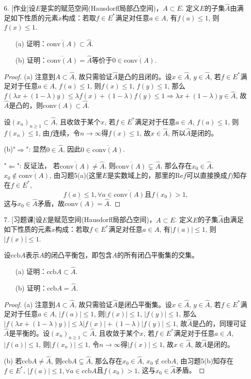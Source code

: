 \documentclass[a4paper,8pt]{ctexart}\textwidth 140mm \textheight 216mm
\newcommand{\8}{\infty}
\renewcommand{\Re}{\mathrm{Re}}
\newcommand{\RA}{\Rightarrow}
\newcommand{\LA}{\Leftarrow}
\begin{document}
6. [作业]设$E$是实的赋范空间(Hausdorff局部凸空间)，$A\subset E$. 定义$E$的子集$\hat{A}$由满足如下性质的元素$x$构成：若取$f\in E^*$满足对任意$a\in A$, 有$f(a)\leq 1$, 则$f(x)\leq 1$. 
\begin{itemize}
	\item[(a)] 证明：$\overline{\mathrm{conv}(A)}\subset \hat{A}$.
	\item[(b)] 证明：$\overline{\mathrm{conv}(A)}=\hat{A}$等价于$0\in\overline{\mathrm{conv}(A)}$.
\end{itemize}
\begin{proof}
	(a) 注意到$A\subset\hat{A}$, 故只需验证$\hat{A}$是凸的且闭的。设$x\in \hat{A}$, $y\in\hat{A}$, 若$f\in E^*$满足对于任意$a\in A$, $f(a)\leq 1$, 则$f(x)\leq 1$, $f(y)\leq 1$, 那么$f(\lambda x+(1-\lambda)y)\leq \lambda f(x)+(1-\lambda)f(y)\leq 1\RA \lambda x+(1-\lambda)y\in\hat{A}$, 故$\hat{A}$是凸的，则$\mathrm{conv}(A)\subset\hat{A}$. 
	
	设$(x_n)_{n\geq 1}\subset \hat{A}$, 且收敛于某个$x$, 若$f\in E^*$满足对于任意$a\in A$, $f(a)\leq 1$, 则$f(x_n)\leq 1$, 由$f$连续，令$n\to\infty$得$f(x)\leq 1$, 故$x\in\hat{A}$, 所以$\hat{A}$是闭的。
	
	(b)"$\RA$": 显然$0\in\hat{A}$, 因此$0\in\overline{\mathrm{conv}(A)}$.
	
	"$\LA$": 反证法，
	若$\overline{\mathrm{conv}(A)}\ne \hat{A}$, 则$\overline{\mathrm{conv}(A)}\subsetneq \hat{A}$, 那么存在$x_0\in \hat{A}$, $x_0\notin\overline{\mathrm{conv}(A)}$, 由习题5(a)(这里$E$是实数域上的，那里的$\Re f$可以直接换成$f$)知存在$f\in E^*$, $$f(a)\leq 1,\forall a\in \overline{\mathrm{conv}(A)}\mbox{且}f(x_0)>1,$$ 这与$x_0\in \hat{A}$矛盾，故$\overline{\mathrm{conv}(A)}=\hat{A}$.
\end{proof}

7. [习题课]设$E$是赋范空间(Hausdorff局部凸空间)，$A\subset E$. 定义$E$的子集$\hat{A}$由满足如下性质的元素$x$构成：若取$f\in E^*$满足对任意$a\in A$, 有$|f(a)|\leq 1$, 则$|f(x)|\leq 1$. 

设$\mathrm{ccb}A$表示$A$的闭凸平衡包，即包含$A$的所有闭凸平衡集的交集。
\begin{itemize}
	\item[(a)] 证明：$\mathrm{ccb} A\subset \hat{A}$.
	\item[(b)] 证明：$\mathrm{ccb}A=\hat{A}$.
\end{itemize}
\begin{proof}
	(a) 注意到$A\subset\hat{A}$, 故只需验证$\hat{A}$是闭凸平衡集。设$x\in \hat{A}$, $y\in\hat{A}$, 若$f\in E^*$满足对于任意$a\in A$, $|f(a)|\leq 1$, 则$|f(x)|\leq 1$, $|f(y)|\leq 1$, 那么$|f(\lambda x+(1-\lambda)y)|\leq \lambda|f(x)|+(1-\lambda)|f(y)|\leq 1$, 故$\hat{A}$是凸的，同理可证$\hat{A}$是平衡的。设$(x_n)_{n\geq 1}\subset \hat{A}$, 且收敛于某个$x$, 若$f\in E^*$满足对于任意$a\in A$, $|f(a)|\leq 1$, 则$|f(x_n)|\leq 1$, 令$n\to\infty$得$|f(x)|\leq 1$, 故$x\in \hat{A}$, 故$\hat{A}$是闭的。
	
	(b)
	若$\mathrm{ccb}A\ne \hat{A}$, 则$\mathrm{ccb}A\subsetneq \hat{A}$, 那么存在$x_0\in \hat{A}$, $x_0\notin\mathrm{ccb}A$, 由习题5(b)知存在$f\in E^*$, $|f(a)|\leq 1,\forall a\in \mathrm{ccb}A$且$f(x_0)>1$, 这与$x_0\in \hat{A}$矛盾。
\end{proof}
\end{document}
